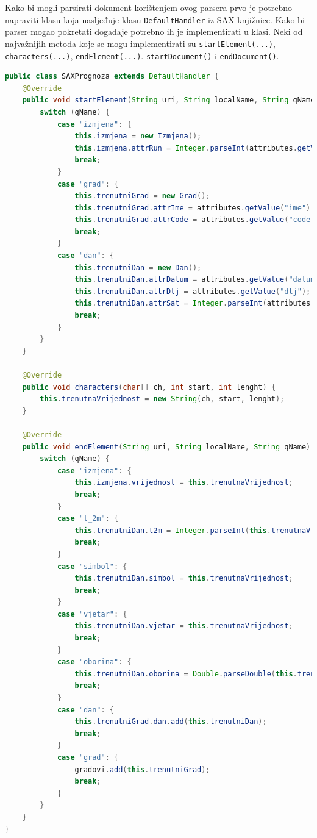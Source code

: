 \documentclass[]{foi}
\begin{document}
Kako bi mogli parsirati dokument korištenjem ovog parsera prvo je potrebno napraviti
klasu koja nasljeđuje klasu \texttt{DefaultHandler} iz SAX knjižnice. Kako bi parser
mogao pokretati događaje potrebno ih je implementirati u klasi. Neki od najvažnijih
metoda koje se mogu implementirati su \texttt{startElement(...)}, \texttt{characters(...)},
\texttt{endElement(...)}. \texttt{startDocument()} i \texttt{endDocument()}.

\begin{lstlisting}[language=java, caption={Primjer implementacije metoda za prihvačanje događaja}]
public class SAXPrognoza extends DefaultHandler {
    @Override
    public void startElement(String uri, String localName, String qName, Attributes attributes) {
        switch (qName) {
            case "izmjena": {
                this.izmjena = new Izmjena();
                this.izmjena.attrRun = Integer.parseInt(attributes.getValue("run"));
                break;
            }
            case "grad": {
                this.trenutniGrad = new Grad();
                this.trenutniGrad.attrIme = attributes.getValue("ime");
                this.trenutniGrad.attrCode = attributes.getValue("code");
                break;
            }
            case "dan": {
                this.trenutniDan = new Dan();
                this.trenutniDan.attrDatum = attributes.getValue("datum");
                this.trenutniDan.attrDtj = attributes.getValue("dtj");
                this.trenutniDan.attrSat = Integer.parseInt(attributes.getValue("sat"));
                break;
            }
        }
    }

    @Override
    public void characters(char[] ch, int start, int lenght) {
        this.trenutnaVrijednost = new String(ch, start, lenght);
    }

    @Override
    public void endElement(String uri, String localName, String qName) {
        switch (qName) {
            case "izmjena": {
                this.izmjena.vrijednost = this.trenutnaVrijednost;
                break;
            }
            case "t_2m": {
                this.trenutniDan.t2m = Integer.parseInt(this.trenutnaVrijednost);
                break;
            }
            case "simbol": {
                this.trenutniDan.simbol = this.trenutnaVrijednost;
                break;
            }
            case "vjetar": {
                this.trenutniDan.vjetar = this.trenutnaVrijednost;
                break;
            }
            case "oborina": {
                this.trenutniDan.oborina = Double.parseDouble(this.trenutnaVrijednost);
                break;
            }
            case "dan": {
                this.trenutniGrad.dan.add(this.trenutniDan);
                break;
            }
            case "grad": {
                gradovi.add(this.trenutniGrad);
                break;
            }
        }
    }
}
\end{lstlisting}
\end{document}
